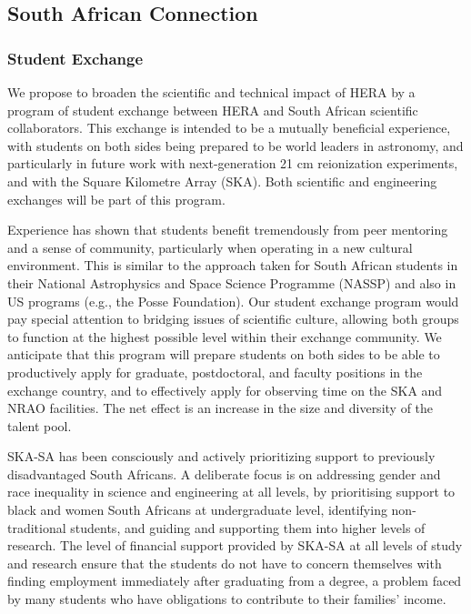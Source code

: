 \documentclass[preprint]{aastex}
\begin{document}
\subsection{South African Connection}

\subsubsection{Student Exchange}

We propose to broaden the scientific and technical impact of HERA by a program of student exchange between HERA and South African scientific collaborators.  This exchange is intended to be a mutually beneficial experience, with students on both sides being prepared to be world leaders in astronomy, and particularly in future work with next-generation 21 cm reionization experiments, and with the Square Kilometre Array (SKA).  Both scientific and engineering exchanges will be part of this program.  

Experience has shown that students benefit tremendously from peer mentoring and a sense of community, particularly when operating in a new cultural environment.  This is similar to the approach taken for South African students in their National Astrophysics and Space Science Programme (NASSP)
and also in US programs (e.g., the Posse Foundation).
Our student exchange program would pay special attention to bridging issues of scientific culture, allowing both groups to function at the highest possible level within their exchange community.  We anticipate that this program will prepare students on both sides to be able to productively apply for graduate, postdoctoral, and faculty positions in the exchange country, and to effectively apply for observing time on the SKA and NRAO facilities.  The net effect is an increase in the size and diversity of the talent pool.

SKA-SA has been consciously and actively prioritizing support to previously disadvantaged South Africans.  A deliberate focus is on addressing gender and race inequality in science and engineering at all levels, by prioritising support to black and women South Africans at undergraduate level, identifying non-traditional students, and guiding and supporting them into higher levels of research.  The level of financial support provided by SKA-SA at all levels of study and research ensure that the students do not have to concern themselves with finding employment immediately after graduating from a degree, a problem faced by many students who have obligations to contribute to their families’ income.
\end{document}
